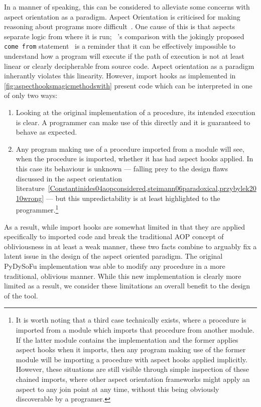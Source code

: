 In a manner of speaking, this can be considered to alleviate some concerns with
aspect orientation as a paradigm. Aspect Orientation is criticised for making
reasoning about programs more
difficult~\cite{przybylek2010wrong,Constantinides04aopconsidered,steimann06paradoxical}.
One cause of this is that aspects separate logic from where it is run;
\citeauthor{Constantinides04aopconsidered}~'s comparison with the jokingly
proposed \lstinline{come from}
statement~\cite{clark73comefrom,Constantinides04aopconsidered} is a reminder
that it can be effectively impossible to understand how a program will execute
if the path of execution is not at least linear or clearly decipherable from
source code. Aspect orientation as a paradigm inherantly violates this
linearity. However, import hooks as implemented in
\cref{fig:aspecthooksmagicmethodswith} present code which can be interpreted in
one of only two ways:

\begin{enumerate}
    \item Looking at the original implementation of a procedure, its intended
    execution is clear. A programmer can make use of this directly and it is
    guaranteed to behave as expected.
    \item Any program making use of a procedure imported from a module will see,
    when the procedure is imported, whether it has had aspect hooks applied. In
    this case its behaviour is unknown --- falling prey to the design flaws
    discussed in the aspect orientation
    literature~\cref{Constantinides04aopconsidered,steimann06paradoxical,przybylek2010wrong}
    --- but this unpredictability is at least highlighted to the
    programmer.\footnote{It is worth noting that a third case technically
    exists, where a procedure is imported from a module which imports that
    procedure from another module. If the latter module contains the
    implementation and the former applies aspect hooks when it imports, then any
    program making use of the former module will be importing a procedure with
    aspect hooks applied implicitly. However, these situations are still visible
    through simple inspection of these chained imports, where other aspect
    orientation frameworks might apply an aspect to any join point at any time,
    without this being obviously discoverable by a programer.}
\end{enumerate}

As a result, while import hooks are somewhat limited in that they are applied
specifically to imported code and break the traditional AOP concept of
obliviousness in at least a weak manner, these two facts combine to arguably fix
a latent issue in the design of the aspect oriented paradigm. The original
PyDySoFu implementation was able to modify any procedure in a more traditional,
oblivious manner. While this new implementation is clearly more limited as a
result, we consider these limitations an overall benefit to the design of the
tool.


